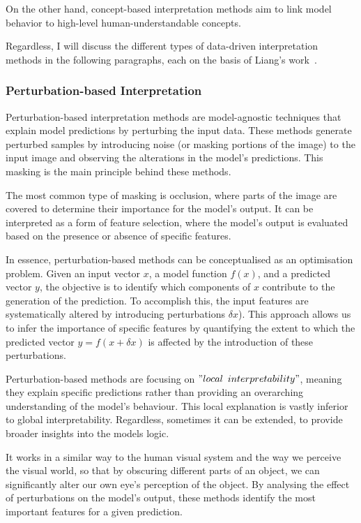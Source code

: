 On the other hand, concept-based interpretation methods aim to link model behavior to high-level human-understandable concepts.

Regardless, I will discuss the different types of data-driven interpretation methods in the following paragraphs, each on the basis of Liang's work~\cite{LIANG2021168}.

\subsubsection{Perturbation-based Interpretation}\label{subsubsec:pertubation-based-interpretation}

Perturbation-based interpretation methods are model-agnostic techniques that explain model predictions by perturbing the input data.
These methods generate perturbed samples by introducing noise (or masking portions of the image) to the input image and observing the alterations in the model's predictions.
This masking is the main principle behind these methods.

The most common type of masking is occlusion, where parts of the image are covered to determine their importance for the model's output.
It can be interpreted as a form of feature selection, where the model's output is evaluated based on the presence or absence of specific features.

In essence, perturbation-based methods can be conceptualised as an optimisation problem.
Given an input vector \( x \), a model function \( f(x) \), and a predicted vector \( y \),
the objective is to identify which components of \( x \) contribute to the generation of the prediction. To accomplish this, the input features are systematically altered by introducing perturbations \( \delta x \)).
This approach allows us to infer the importance of specific features by quantifying the extent to which the predicted vector \(y = f(x + \delta x) \) is affected by the introduction of these perturbations.



Perturbation-based methods are focusing on \("local\) \(interpretability"\), meaning they explain specific predictions rather than providing an overarching understanding of the model’s behaviour.
This local explanation is vastly inferior to global interpretability.
Regardless, sometimes it can be extended, to provide broader insights into the models logic.

It works in a similar way to the human visual system and the way we perceive the visual world,
so that by obscuring different parts of an object, we can significantly alter our own eye's perception of the object.
By analysing the effect of perturbations on the model's output, these methods identify the most important features for a given prediction.

